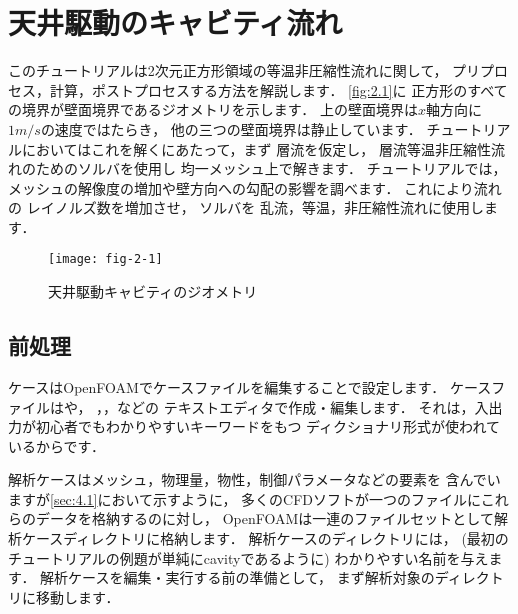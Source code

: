 \section{天井駆動のキャビティ流れ}
\label{sec:2.1}
%
%
%
このチュートリアルは2次元正方形領域の等温非圧縮性流れに関して，
プリプロセス，計算，ポストプロセスする方法を解説します．
\autoref{fig:2.1}に
正方形のすべての境界が壁面境界であるジオメトリを示します．
上の壁面境界は$x$軸方向に$1\unit{m/s}$の速度ではたらき，
他の三つの壁面境界は静止しています．
チュートリアルにおいてはこれを解くにあたって，まず
%
層流を仮定し，
層流等温非圧縮性流れのためのソルバを使用し
均一メッシュ上で解きます．
チュートリアルでは，
メッシュの解像度の増加や壁方向への勾配の影響を調べます．
これにより流れの
%
レイノルズ数を増加させ，
%
%
ソルバを
%
乱流，等温，非圧縮性流れに使用します．


\begin{figure}[ht]
 \texttt{[image: fig-2-1]}
 \caption{天井駆動キャビティのジオメトリ}
 \label{fig:2.1}
\end{figure}


\subsection{前処理}
\label{ssec:2.1.1}
ケースはOpenFOAMでケースファイルを編集することで設定します．
ケースファイルはや，
，，などの
テキストエディタで作成・編集します．
それは，入出力が初心者でもわかりやすいキーワードをもつ
ディクショナリ形式が使われているからです．

解析ケースはメッシュ，物理量，物性，制御パラメータなどの要素を
含んでいますが\autoref{sec:4.1}において示すように，
多くのCFDソフトが一つのファイルにこれらのデータを格納するのに対し，
OpenFOAMは一連のファイルセットとして解析ケースディレクトリに格納します．
解析ケースのディレクトリには，
(最初のチュートリアルの例題が単純にcavityであるように)
わかりやすい名前を与えます．
解析ケースを編集・実行する前の準備として，
まず解析対象のディレクトリに移動します．

